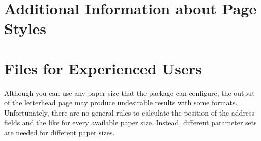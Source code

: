\section{Additional Information about Page Styles}
\BeginIndexGroup
{}

%
\EndIndexGroup

\section{ Files for Experienced Users}
\BeginIndexGroup
{}

\BeginIndexGroup%
%
Although you can use any paper size that the
\hyperref[cha:typearea]{}%
 package can configure, the output of the letterhead
page may produce undesirable results with some formats. Unfortunately, there
are no general rules to calculate the position of the address fields and the
like for every available paper size. Instead, different parameter sets are
needed for different paper sizes.%


